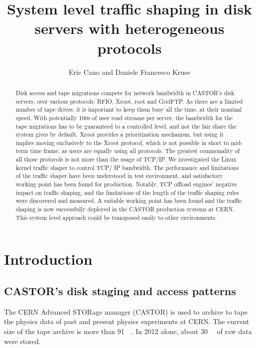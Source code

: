 \documentclass[a4paper]{jpconf}
\begin{document}
\title{System level traffic shaping in disk servers with heterogeneous protocols}

\author{Eric Cano and Daniele Francesco Kruse}

\address{European Organization for Nuclear Research CERN, CH-1211 Gen\`eve 23,
Switzerland}


\begin{abstract}
Disk access and tape migrations compete for network bandwidth in CASTOR’s disk servers, over various protocols: RFIO, Xroot, root and GridFTP. As there are a limited number of tape drives, it is important to keep them busy all the time, at their nominal speed. With potentially 100s of user read streams per server, the bandwidth for the tape migrations has to be guaranteed to a controlled level, and not the fair share the system gives by default. Xroot provides a prioritization mechanism, but using it implies moving exclusively to the Xroot protocol, which is not possible in short to mid-term time frame,  as users are equally using all protocols. The greatest commonality of all those protocols is not  more than the usage of TCP/IP. We investigated the Linux kernel traffic shaper to control TCP/ IP bandwidth. The performance and limitations of the traffic shaper have been understood  in test environment, and satisfactory working point has been found for production.  Notably, TCP offload engines' negative impact on traffic shaping, and the limitations of  the length of the traffic shaping rules were discovered and measured. A suitable working  point has been found and the traffic shaping is now successfully deployed in the CASTOR  production systems at CERN. This system level approach could be transposed easily to other  environments.
\end{abstract}

\section{Introduction}
\subsection{CASTOR's disk staging and access patterns}
The CERN Advanced STORage manager (CASTOR) \cite{CASTORweb} is used to archive to tape the physics data of past and present physics experiments at CERN. The current size of the tape archive is more than \SI{91}{\peta\byte}. In 2012 alone, about \SI{30}{\peta\byte} of raw data were stored.
\end{document}
